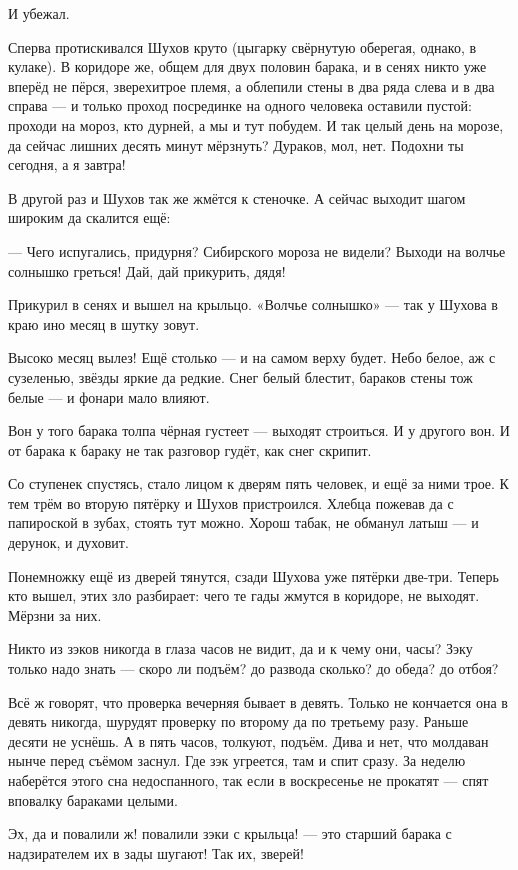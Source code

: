 И убежал.

Сперва протискивался Шухов круто (цыгарку свёрнутую оберегая, однако, в кулаке). В коридоре
же, общем для двух половин барака, и в сенях никто уже вперёд не пёрся, зверехитрое племя, а
облепили стены в два ряда слева и в два справа --- и только проход посрединке на одного
человека оставили пустой: проходи на мороз, кто дурней, а мы и тут побудем. И так целый день на
морозе, да сейчас лишних десять минут мёрзнуть? Дураков, мол, нет. Подохни ты сегодня, а я
завтра!

В другой раз и Шухов так же жмётся к стеночке. А сейчас выходит шагом широким да скалится ещё:

--- Чего испугались, придурня? Сибирского мороза не видели? Выходи на волчье солнышко греться!
Дай, дай прикурить, дядя!

Прикурил в сенях и вышел на крыльцо. «Волчье солнышко» --- так у Шухова в краю ино месяц в
шутку зовут.

Высоко месяц вылез! Ещё столько --- и на самом верху будет. Небо белое, аж с сузеленью, звёзды
яркие да редкие. Снег белый блестит, бараков стены тож белые --- и фонари мало влияют.

Вон у того барака толпа чёрная густеет --- выходят строиться. И у другого вон. И от барака к
бараку не так разговор гудёт, как снег скрипит.

Со ступенек спустясь, стало лицом к дверям пять человек, и ещё за ними трое. К тем трём во
вторую пятёрку и Шухов пристроился. Хлебца пожевав да с папироской в зубах, стоять тут можно.
Хорош табак, не обманул латыш --- и дерунок, и духовит.

Понемножку ещё из дверей тянутся, сзади Шухова уже пятёрки две-три. Теперь кто вышел, этих
зло разбирает: чего те гады жмутся в коридоре, не выходят. Мёрзни за них.

Никто из зэков никогда в глаза часов не видит, да и к чему они, часы? Зэку только надо знать ---
скоро ли подъём? до развода сколько? до обеда? до отбоя?

Всё ж говорят, что проверка вечерняя бывает в девять. Только не кончается она в девять
никогда, шурудят проверку по второму да по третьему разу. Раньше десяти не уснёшь. А в пять
часов, толкуют, подъём. Дива и нет, что молдаван нынче перед съёмом заснул. Где зэк угреется,
там и спит сразу. За неделю наберётся этого сна недоспанного, так если в воскресенье не
прокатят --- спят вповалку бараками целыми.

Эх, да и повалили ж! повалили зэки с крыльца! --- это старший барака с надзирателем их в зады
шугают! Так их, зверей!

